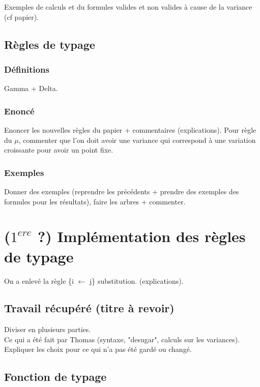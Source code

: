 \documentclass[11pt,a4paper]{article}
\begin{document}
Exemples de calculs et du formules valides et non valides à cause de la variance (cf papier).

\subsection{Règles de typage}

\subsubsection{Définitions}

Gamma + Delta.

\subsubsection{Enoncé}

Enoncer les nouvelles règles du papier + commentaires (explications). \color{red} Pour règle du $\mu$, commenter que l'on doit avoir une variance qui correspond à une variation croissante pour avoir un point fixe. \color{black}

\subsubsection{Exemples}

Donner des exemples (reprendre les précédents + prendre des exemples des formules pour les résultats), faire les arbres + commenter.

\section{($1^{ere}$ ?) Implémentation des règles de typage}

On a enlevé la règle \{i $\longleftarrow$ j\} substitution. (explications).


\subsection{Travail récupéré (titre à revoir)}

Diviser en plusieurs parties.
\\
Ce qui a été fait par Thomas (syntaxe, "desugar", calculs sur les variances). 
\\
Expliquer les choix pour ce qui n'a pas été gardé ou changé. 

\subsection{Fonction de typage}
\end{document}
